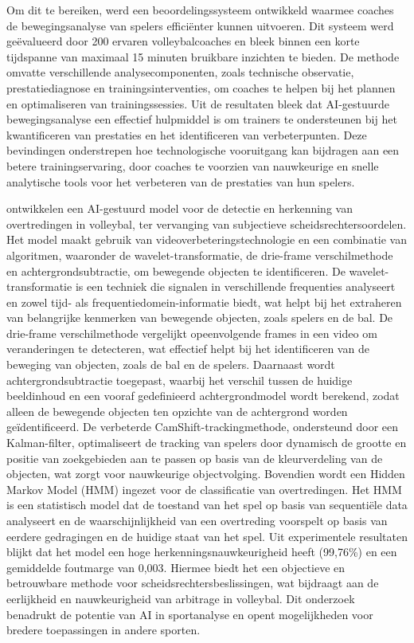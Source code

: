 Om dit te bereiken, werd een beoordelingssysteem ontwikkeld waarmee coaches de bewegingsanalyse van spelers efficiënter kunnen uitvoeren. Dit systeem werd geëvalueerd door 200 ervaren volleybalcoaches en bleek binnen een korte tijdspanne van maximaal 15 minuten bruikbare inzichten te bieden. De methode omvatte verschillende analysecomponenten, zoals technische observatie, prestatiediagnose en trainingsinterventies, om coaches te helpen bij het plannen en optimaliseren van trainingssessies.
Uit de resultaten bleek dat AI-gestuurde bewegingsanalyse een effectief hulpmiddel is om trainers te ondersteunen bij het kwantificeren van prestaties en het identificeren van verbeterpunten.
Deze bevindingen onderstrepen hoe technologische vooruitgang kan bijdragen aan een betere trainingservaring, door coaches te voorzien van nauwkeurige en snelle analytische tools voor het verbeteren van de prestaties van hun spelers.

\textcite{Huang2023} ontwikkelen een AI-gestuurd model voor de detectie en herkenning van overtredingen in volleybal, ter vervanging van subjectieve scheidsrechtersoordelen. Het model maakt gebruik van videoverbeteringstechnologie en een combinatie van algoritmen, waaronder de wavelet-transformatie, de drie-frame verschilmethode en achtergrondsubtractie, om bewegende objecten te identificeren. De wavelet-transformatie is een techniek die signalen in verschillende frequenties analyseert en zowel tijd- als frequentiedomein-informatie biedt, wat helpt bij het extraheren van belangrijke kenmerken van bewegende objecten, zoals spelers en de bal. De drie-frame verschilmethode vergelijkt opeenvolgende frames in een video om veranderingen te detecteren, wat effectief helpt bij het identificeren van de beweging van objecten, zoals de bal en de spelers. Daarnaast wordt achtergrondsubtractie toegepast, waarbij het verschil tussen de huidige beeldinhoud en een vooraf gedefinieerd achtergrondmodel wordt berekend, zodat alleen de bewegende objecten ten opzichte van de achtergrond worden geïdentificeerd.
De verbeterde CamShift-trackingmethode, ondersteund door een Kalman-filter, optimaliseert de tracking van spelers door dynamisch de grootte en positie van zoekgebieden aan te passen op basis van de kleurverdeling van de objecten, wat zorgt voor nauwkeurige objectvolging. Bovendien wordt een Hidden Markov Model (HMM) ingezet voor de classificatie van overtredingen. Het HMM is een statistisch model dat de toestand van het spel op basis van sequentiële data analyseert en de waarschijnlijkheid van een overtreding voorspelt op basis van eerdere gedragingen en de huidige staat van het spel.
Uit experimentele resultaten blijkt dat het model een hoge herkenningsnauwkeurigheid heeft (99,76\%) en een gemiddelde foutmarge van 0,003. Hiermee biedt het een objectieve en betrouwbare methode voor scheidsrechtersbeslissingen, wat bijdraagt aan de eerlijkheid en nauwkeurigheid van arbitrage in volleybal. Dit onderzoek benadrukt de potentie van AI in sportanalyse en opent mogelijkheden voor bredere toepassingen in andere sporten.

